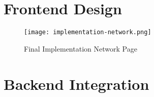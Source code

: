 \section{Frontend Design}

\begin{figure}[h]
    \centering
    \texttt{[image: implementation-network.png]}
    \caption{Final Implementation Network Page}
    \label{fig:wire-4}
\end{figure}



\section{Backend Integration}

